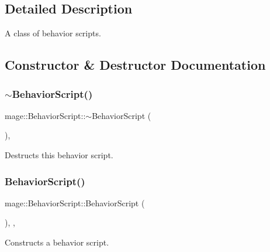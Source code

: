 \subsection{Detailed Description}
A class of behavior scripts. 

\subsection{Constructor \& Destructor Documentation}
\hypertarget{classmage_1_1_behavior_script_a61e4825ba0fc7746d49faa44ed7bc481}{}\label{classmage_1_1_behavior_script_a61e4825ba0fc7746d49faa44ed7bc481} 
\subsubsection{\texorpdfstring{$\sim$\+Behavior\+Script()}{~BehaviorScript()}}
{\footnotesize\ttfamily mage\+::\+Behavior\+Script\+::$\sim$\+Behavior\+Script (\begin{DoxyParamCaption}{ }\end{DoxyParamCaption})\hspace{0.3cm}{\ttfamily [virtual]}, {\ttfamily [default]}}

Destructs this behavior script. \hypertarget{classmage_1_1_behavior_script_adbe64d10ebd511f05af9e0930e245913}{}\label{classmage_1_1_behavior_script_adbe64d10ebd511f05af9e0930e245913} 
\subsubsection{\texorpdfstring{Behavior\+Script()}{BehaviorScript()}\hspace{0.1cm}{\footnotesize\ttfamily [1/3]}}
{\footnotesize\ttfamily mage\+::\+Behavior\+Script\+::\+Behavior\+Script (\begin{DoxyParamCaption}{ }\end{DoxyParamCaption})\hspace{0.3cm}{\ttfamily [protected]}, {\ttfamily [default]}, {\ttfamily [noexcept]}}

Constructs a behavior script. \hypertarget{classmage_1_1_behavior_script_a0f3baaa9549ab272f0711c06d33ad223}{}\label{classmage_1_1_behavior_script_a0f3baaa9549ab272f0711c06d33ad223} 
